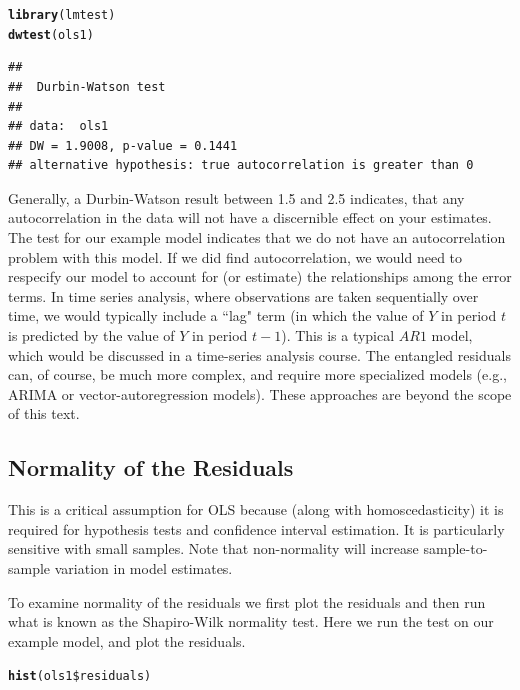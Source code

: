 \documentclass[11pt,openany]{book}\usepackage[]{graphicx}\usepackage[]{color}
\makeatletter
\newcommand{\hlopt}[1]{\textcolor[rgb]{0,0,0}{#1}}%
\newcommand{\hlstd}[1]{\textcolor[rgb]{0.345,0.345,0.345}{#1}}%
\newcommand{\hlkwd}[1]{\textcolor[rgb]{0.737,0.353,0.396}{\textbf{#1}}}%
\newenvironment{kframe}{%
 \def\at@end@of@kframe{}%
 \ifinner\ifhmode%
  \def\at@end@of@kframe{\end{minipage}}%
  \begin{minipage}{\columnwidth}%
 \fi\fi%
 \def\FrameCommand##1{\hskip\@totalleftmargin \hskip-\fboxsep
 \colorbox{shadecolor}{##1}\hskip-\fboxsep
     \hskip-\linewidth \hskip-\@totalleftmargin \hskip\columnwidth}%
 \MakeFramed {\advance\hsize-\width
   \@totalleftmargin\z@ \linewidth\hsize
   \@setminipage}}%
 {\par\unskip\endMakeFramed%
 \at@end@of@kframe}
\newenvironment{knitrout}{}{} %
\renewenvironment{knitrout}{\begin{singlespace}}{\end{singlespace}}
\makeatother
\begin{document}
\begin{knitrout}
\color{fgcolor}\begin{kframe}
\begin{alltt}
\hlkwd{library}\hlstd{(lmtest)}
\hlkwd{dwtest}\hlstd{(ols1)}
\end{alltt}
\begin{verbatim}
## 
## 	Durbin-Watson test
## 
## data:  ols1
## DW = 1.9008, p-value = 0.1441
## alternative hypothesis: true autocorrelation is greater than 0
\end{verbatim}
\end{kframe}
\end{knitrout}
\noindent Generally, a Durbin-Watson result between 1.5 and 2.5 indicates, that any autocorrelation in the data will not have a discernible effect on your estimates.  The test for our example model indicates that we do not have an autocorrelation problem with this model. If we did find autocorrelation, we would need to respecify our model to account for (or estimate) the relationships among the error terms. In time series analysis, where observations are taken sequentially over time, we would typically include a ``lag" term (in which the value of $Y$ in period $t$ is predicted by the value of $Y$ in period $t-1$). This is a typical $AR1$ model, which would be discussed in a time-series analysis course. The entangled residuals  can, of course, be much more complex, and require more specialized models (e.g.,  ARIMA or vector-autoregression models). These approaches are beyond the  scope of this text.

\subsection{Normality of the Residuals} 

This is a critical assumption for OLS because (along with homoscedasticity) it is required for  hypothesis tests and confidence interval estimation. It is particularly sensitive with small samples. Note that non-normality will increase sample-to-sample variation in model estimates. 

To examine normality of the residuals we first plot the residuals and then run what is known as the Shapiro-Wilk normality test. Here we run the test on our example model, and plot the residuals.

\begin{knitrout}
\color{fgcolor}\begin{kframe}
\begin{alltt}
\hlkwd{hist}\hlstd{(ols1}\hlopt{\$}\hlstd{residuals)}
\end{alltt}
\end{kframe}
\end{knitrout}
\end{document}
